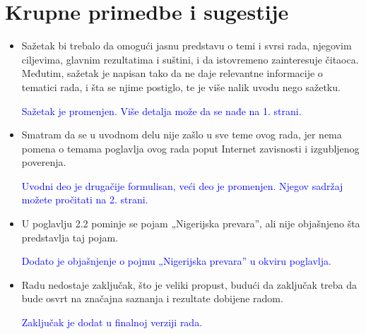 \documentclass[a4paper]{report}
\newcommand{\odgovor}[1]{\textcolor{blue}{#1}}
\begin{document}
\section{Krupne primedbe i sugestije}
\begin{itemize}
    \item Sažetak bi trebalo da omogući jasnu predstavu o temi i svrsi rada, njegovim ciljevima, glavnim rezultatima i suštini, i da istovremeno zainteresuje čitaoca. Međutim, sažetak je napisan tako da ne daje relevantne informacije o tematici rada, i šta se njime postiglo, te je više nalik uvodu nego sažetku. 
    
    \odgovor{Sažetak je promenjen. Više detalja može da se nađe na 1. strani.}
\end{itemize}
\begin{itemize}
    \item Smatram da se u uvodnom delu nije zašlo u sve teme ovog rada, jer nema pomena o temama poglavlja ovog rada poput Internet zavisnosti i izgubljenog poverenja. 
    
    \odgovor{Uvodni deo je drugačije formulisan, veći deo je promenjen. Njegov sadržaj možete pročitati na 2. strani.}
\end{itemize}
\begin{itemize}
    \item U poglavlju 2.2 pominje se pojam „Nigerijska prevara”, ali nije objašnjeno šta predstavlja taj pojam.
   
    \odgovor{Dodato je objašnjenje o pojmu „Nigerijska prevara” u okviru poglavlja.}
\end{itemize}
\begin{itemize}
    \item  Radu nedostaje zaključak, što je veliki propust, budući da zaključak treba da bude osvrt na značajna saznanja i rezultate dobijene radom. 
   
    \odgovor{Zaključak je dodat u finalnoj verziji rada.}
\end{itemize}
\end{document}
